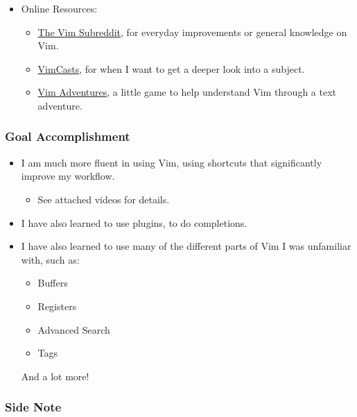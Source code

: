 \documentclass[xclolor=dvipsnames]{beamer}            %
\begin{document}
\begin{darkframes}
\begin{frame}
\begin{itemize}
            \item Online Resources:
                \begin{itemize}
                    \item \href{https://www.reddit.com/r/vim/}{The Vim Subreddit}, for everyday improvements or general knowledge on Vim.
                    \item \href{http://vimcasts.org}{VimCasts}, for when I want to get a deeper look into a subject.
                    \item \href{https://vim-adventures.com}{Vim Adventures}, a little game to help understand Vim through a text adventure.
                \end{itemize}
        \end{itemize}
    \end{frame}

    \begin{frame}
        \frametitle{Goal Accomplishment}

        \begin{itemize}
            \item I am much more fluent in using Vim, using shortcuts that significantly improve my workflow.
                \begin{itemize}
                    \item See attached videos for details.
                \end{itemize}

            \item I have also learned to use plugins, to do completions.
            \item I have also learned to use many of the different parts of Vim I was unfamiliar with, such as:
                \begin{itemize}
                    \item Buffers
                    \item Registers
                    \item Advanced Search
                    \item Tags
                \end{itemize}

                And a lot more!
        \end{itemize}
    \end{frame}

    \begin{frame}
        \frametitle{Side Note}


\end{frame}
\end{darkframes}
\end{document}
